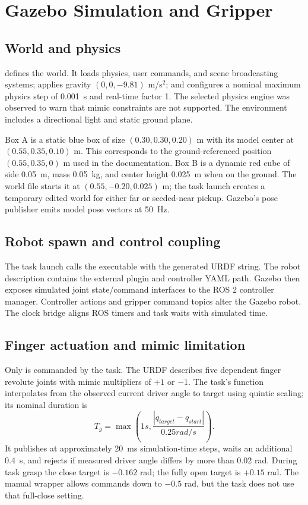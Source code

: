\chapter{Gazebo Simulation and Gripper}
\label{ch:gazebo}

\section{World and physics}
 defines the
 world. It loads physics, user commands, and scene
broadcasting systems; applies gravity $(0,0,-9.81)$ m/s$^2$; and configures a
nominal maximum physics step of \SI{0.001}{s} and real-time factor 1. The
selected physics engine was observed to warn that mimic constraints are not
supported. The environment includes a directional light and static ground
plane.

Box A is a static blue box of size $(0.30,0.30,0.20)$ m with its model center
at $(0.55,0.35,0.10)$ m. This corresponds to the ground-referenced position
$(0.55,0.35,0)$ m used in the documentation. Box B is a dynamic red cube of
side \SI{0.05}{m}, mass \SI{0.05}{kg}, and center height \SI{0.025}{m} when on
the ground. The world file starts it at $(0.55,-0.20,0.025)$ m; the task
launch creates a temporary edited world for either far or seeded-near pickup.
Gazebo's pose publisher emits model pose vectors at \SI{50}{Hz}.

\section{Robot spawn and control coupling}
The task launch calls the  executable with the
generated URDF string. The robot description contains the external
 plugin and controller YAML path.
Gazebo then exposes simulated joint state/command interfaces to the ROS 2
controller manager. Controller actions and gripper command topics alter the
Gazebo robot. The clock bridge aligns ROS timers and task waits with simulated
time.

\section{Finger actuation and mimic limitation}
Only  is commanded by the task. The URDF describes five
dependent finger revolute joints with mimic multipliers of $+1$ or $-1$. The
task's  function interpolates from the observed current
driver angle to target using quintic scaling; its nominal duration is
\begin{equation}
 T_g=\max\left(1\si{s},\frac{|q_{target}-q_{start}|}{0.25\si{rad/s}}\right).
\end{equation}
It publishes at approximately \SI{20}{ms} simulation-time steps, waits an
additional \SI{0.4}{s}, and rejects if measured driver angle differs by more
than 0.02 rad. During task grasp the close target is $-0.162$ rad; the fully
open target is $+0.15$ rad. The manual wrapper allows commands down to
$-0.5$ rad, but the task does not use that full-close setting.

